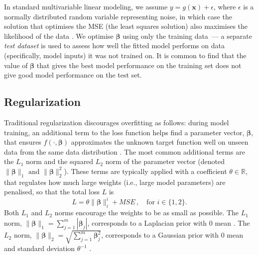 \documentclass{article}
\newcommand{\kibitz}[2]{\ifnum\Comments=1\textcolor{#1}{#2}\fi}
\newcommand{\kizito}[1]{\kibitz{red} {[Kizito: #1]}}
\newcommand{\tillman}[1]{\kibitz{darkgreen} {[Tillman: #1]}}
\begin{document}
In standard multivariable linear modeling, we assume $y = g(\mathbf{x}) + \epsilon $, where $\epsilon$ is a normally distributed random variable representing noise, in which case the solution that optimises the MSE (the least squares solution) also maximises the likelihood of the data \cite{hastie01statisticallearning}.
We optimise $\boldsymbol{\beta}$ using only the training data~--- a separate \emph{test dataset} is used to assess how well the fitted model performs on data (specifically, model inputs) it was not trained on. 
It is common to find that the value of $\boldsymbol{\beta}$ that gives the best model performance on the training set does not give good model performance on the test set. %

\subsection{Regularization}
Traditional regularization discourages overfitting as follows: during model training, an additional term to the loss function helps find a parameter vector, $\boldsymbol{\beta}$, that ensures $f(\cdot,\boldsymbol{\beta})$ approximates the unknown target function well on unseen data from the same data distribution  \cite{Kukacka2017regsurvey}.
The most common additional terms are the $L_1$ norm and the squared $L_2$ norm of the parameter vector (denoted $\|\boldsymbol{\beta}\|_1\mbox{ and } \|\boldsymbol{\beta}\|_2^2$). These terms are typically applied with a coefficient $\theta \in \mathbb{R}$, that regulates how much large weights %
(i.e., large model parameters) are penalised, so that the total loss $L$ is%
\begin{equation}
  L = \theta \|\boldsymbol{\beta}\|_i^i + MSE\,,\quad\mbox{for }i \in \{1,2\}.
\end{equation}
Both $L_1$ and $L_2$ norms encourage the weights to be as small as possible. %
The $L_1$ norm, $\|\boldsymbol{\beta}\|_1 = \sum_{j=1}^m |\boldsymbol{\beta}_j|$, corresponds to a Laplacian prior with 0 mean \cite{williams1995bayesian,plaut86,tibshirani1996L1}. The $L_2$ norm, $\|\boldsymbol{\beta}\|_2 = \sqrt{ \sum_{j=1}^m \boldsymbol{\beta}_j^2}$, corresponds to a Gaussian prior with 0 mean and standard deviation $\theta^{-1}$ \cite{rennie2003l2,Bishop95}.
 
\end{document}
